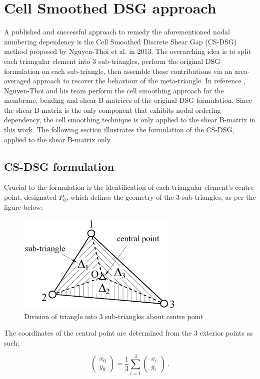 \section{Cell Smoothed DSG approach}
A published and successful approach to remedy the aforementioned nodal numbering dependency is the Cell Smoothed Discrete Shear Gap (CS-DSG) method proposed by Nguyen-Thoi et al. \cite{Ngu13} in 2013. The overarching idea is to split each triangular element into 3 sub-triangles, perform the original DSG formulation on each sub-triangle, then assemble these contributions via an area-averaged approach to recover the behaviour of the meta-triangle. In reference \cite{Ngu13}, Nguyen-Thoi and his team perform the cell smoothing approach for the membrane, bending and shear B matrices of the original DSG formulation. Since the shear B-matrix is the only component that exhibits nodal ordering dependency, the cell smoothing technique is only applied to the shear B-matrix in this work. The following section illustrates the formulation of the CS-DSG, applied to the shear B-matrix only.

\subsection{CS-DSG formulation}
Crucial to the formulation is the identification of each triangular element's centre point, designated $P_0$, which defines the geometry of the 3 sub-triangles, as per the figure below:

\begin{figure}[H]
	\centering
	\includegraphics[width=8cm]{images/CSDSG3_subtriangles.png}
	\caption{Division of triangle into 3 sub-triangles about centre point \cite{phung2013static}}
	\label{fig:triangle division}
\end{figure}

The coordinates of the central point are determined from the 3 exterior points as such:

\begin{equation} 
\begin{pmatrix}
x_0 \\
y_0
\end{pmatrix}
=
\frac{1}{3}
\sum_{i=1}^3
\begin{pmatrix}
x_i \\
y_i
\end{pmatrix}
\label{eqCSDSG0}\ .
\end{equation}

